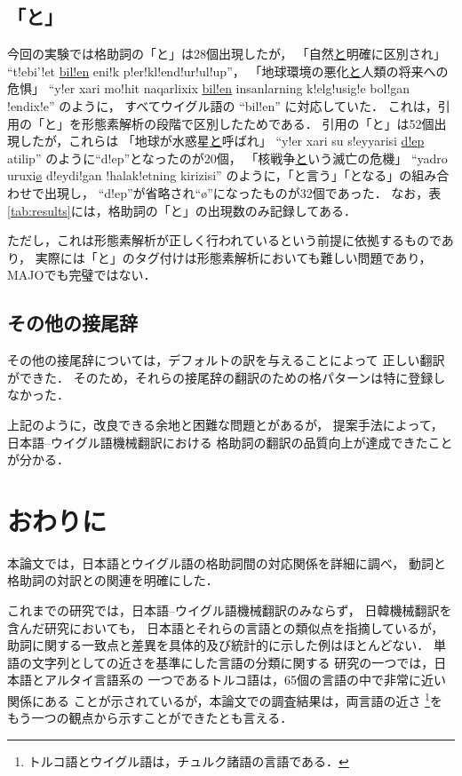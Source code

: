\subsection{「と」}
\label{sec:ex_to}
今回の実験では格助詞の「と」は28個出現したが，
「自然\underline{と}明確に区別され」 ``t!ebi'!et \underline{bil!en} eni!k
p!er!kl!end!ur!ul!up''，
「地球環境の悪化\underline{と}人類の将来への危惧」
``y!er xari mo!hit naqarlixix \underline{bil!en}
insanlarning k!elg!usig!e bol!gan !endix!e''
のように，
すべてウイグル語の ``bil!en''
に対応していた．
これは，引用の「と」を形態素解析の段階で区別したためである．
引用の「と」は52個出現したが，これらは
「地球が水惑星\underline{と}呼ばれ」
``y!er xari su s!eyyarisi \underline{d!ep} atilip''
のように``d!ep''となったのが20個，
「核戦争\underline{と}いう滅亡の危機」
``yadro uruxi\underline{\o} d!eydi!gan !halak!etning kirizisi''
のように，「と言う」「となる」の組み合わせで出現し，
``d!ep''が省略され``\o''になったものが32個であった．
なお，表\ref{tab:results}には，格助詞の「と」の出現数のみ記録してある．

ただし，これは形態素解析が正しく行われているという前提に依拠するものであり，
実際には「と」のタグ付けは形態素解析においても難しい問題であり，
MAJOでも完璧ではない．

\subsection{その他の接尾辞}
その他の接尾辞については，デフォルトの訳を与えることによって
正しい翻訳ができた．
そのため，それらの接尾辞の翻訳のための格パターンは特に登録しなかった．

上記のように，改良できる余地と困難な問題とがあるが，
提案手法によって，日本語--ウイグル語機械翻訳における
格助詞の翻訳の品質向上が達成できたことが分かる．

\section{おわりに}
本論文では，日本語とウイグル語の格助詞間の対応関係を詳細に調べ，
動詞と格助詞の対訳との関連を明確にした．

これまでの研究では，日本語--ウイグル語機械翻訳のみならず，
日韓機械翻訳を含んだ研究においても，
日本語とそれらの言語との類似点を指摘しているが，
助詞に関する一致点と差異を具体的及び統計的に示した例はほとんどない．
単語の文字列としての近さを基準にした言語の分類に関する
研究の一つ\cite{Vlad}では，日本語とアルタイ言語系の
一つであるトルコ語は，65個の言語の中で非常に近い関係にある
ことが示されているが，本論文での調査結果は，両言語の近さ
\footnote{トルコ語とウイグル語は，チュルク諸語の言語である．}を
もう一つの観点から示すことができたとも言える．

